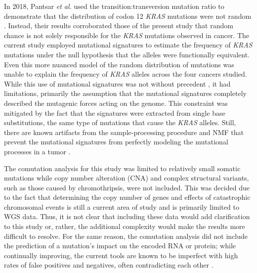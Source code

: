 \documentclass[english, 10pt, letterpaper]{article}
\newcommand{\KRAS}{\emph{KRAS}}
\begin{document}
In 2018, Pantsar \emph{et al.} used the transition:transversion mutation ratio to demonstrate that the distribution of codon 12 \KRAS{} mutations were not random \cite{Pantsar2018}.
Instead, their results corroborated those of the present study that random chance is not solely responsible for the \KRAS{} mutations observed in cancer.
The current study employed mutational signatures to estimate the frequency of \KRAS{} mutations under the null hypothesis that the alleles were functionally equivalent.
Even this more nuanced model of the random distribution of mutations was unable to explain the frequency of \KRAS{} alleles across the four cancers studied.
While this use of mutational signatures was not without precedent \cite{Dietlein2020IdentificationContext., Bergstrom2020GeneratingSigProfilerSimulator}, it had limitations, primarily the assumption that the mutational signatures completely described the mutagenic forces acting on the genome.
This constraint was mitigated by the fact that the signatures were extracted from single base substitutions, the same type of mutations that cause the \KRAS{} alleles.
Still, there are known artifacts from the sample-processing procedure and NMF that prevent the mutational signatures from perfectly modeling the mutational processes in a tumor \cite{Alexandrov2015, Gawad2016, Alexandrov2020TheCancer.}.

The comutation analysis for this study was limited to relatively small somatic mutations while copy number alteration (CNA) and complex structural variants, such as those caused by chromothripsis, were not included.
This was decided due to the fact that determining the copy number of genes and effects of catastrophic chromosomal events is still a current area of study and is primarily limited to WGS data.
Thus, it is not clear that including these data would add clarification to this study or, rather, the additional complexity would make the results more difficult to resolve.
For the same reason, the comutation analysis did not include the prediction of a mutation's impact on the encoded RNA or protein; while continually improving, the current tools are known to be imperfect with high rates of false positives and negatives, often contradicting each other \cite{Dong2015ComparisonStudies., Chun2009IdentificationGenomes., Schwarz2010MutationTasterAlterations., Thusberg2011PerformanceVariants., Wei2011IncorporatingStudy., Flanagan2010UsingMutations.}.
\end{document}
